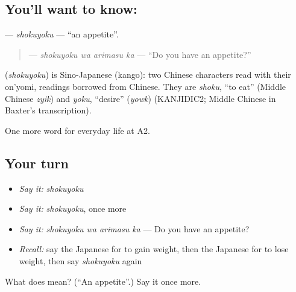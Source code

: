 \subsection*{You'll want to know: }
\textbf{} — \emph{shokuyoku} — \textquotedblleft{}an appetite\textquotedblright{}.

\begin{quote}
\textbf{ } — \emph{shokuyoku wa arimasu ka} — \textquotedblleft{}Do you have an appetite?\textquotedblright{}
\end{quote}

\begin{cousinweb}
\textbf{} (\emph{shokuyoku}) is Sino-Japanese (kango): two Chinese characters read with their on'yomi, readings borrowed from Chinese. They are \emph{shoku}, \textquotedblleft{}to eat\textquotedblright{} (Middle Chinese \emph{zyik}) and \emph{yoku}, \textquotedblleft{}desire\textquotedblright{} (\emph{yowk}) (KANJIDIC2; Middle Chinese in Baxter's transcription).
\end{cousinweb}

\begin{grammarlens}[title={What you've built}]
One more word for everyday life at A2.
\end{grammarlens}

\subsection*{Your turn}
\begin{itemize}
\raggedright
  \item \emph{Say it:} \emph{shokuyoku}
  \item \emph{Say it:} \emph{shokuyoku}, once more
  \item \emph{Say it:} \emph{shokuyoku wa arimasu ka} — Do you have an appetite?
  \item \emph{Recall:} say the Japanese for to gain weight, then the Japanese for to lose weight, then say \emph{shokuyoku} again
\end{itemize}

\begin{tcolorbox}[breakable,colback=teal!4,colframe=teal!35!black,title={Before you move on}]
What does  mean? (\textquotedblleft{}An appetite\textquotedblright{}.) Say it once more.
\end{tcolorbox}
